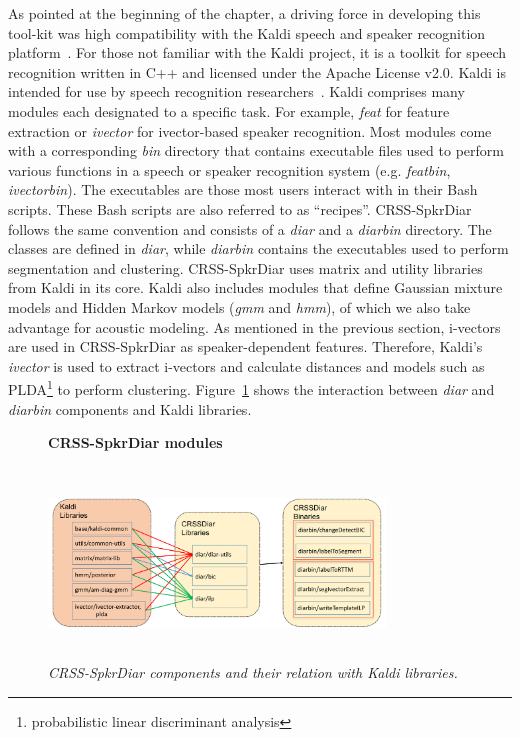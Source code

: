 As pointed at the beginning of the chapter, a driving force in developing this tool-kit was high compatibility with the Kaldi speech and speaker recognition platform~\cite{kaldi}. 
For those not familiar with the Kaldi project, it is a toolkit for speech recognition written in C++ and licensed under the Apache License v2.0. Kaldi is intended for use by speech recognition researchers~\cite{kaldi}. 
Kaldi comprises many modules each designated to a specific task. For example, {\it feat} for feature extraction or {\it ivector} for ivector-based speaker recognition. 
Most modules come with a corresponding {\it bin} directory  that contains executable files used to perform various functions in a speech or speaker recognition system (e.g. {\it featbin}, {\it ivectorbin}). 
The executables are those most users interact with in their Bash scripts. These Bash scripts are also referred to as ``recipes''. 
CRSS-SpkrDiar follows the same convention and consists of a {\it diar} and a {\it diarbin} directory. 
The classes are defined in {\it diar}, while {\it diarbin} contains the executables used to perform segmentation and clustering. 
CRSS-SpkrDiar uses matrix and utility libraries from Kaldi in its core.  
Kaldi also includes modules that define Gaussian mixture models and Hidden Markov models ({\it gmm} and {\it hmm}), of which we also take advantage for acoustic modeling. 
As mentioned in the previous section, i-vectors are used in CRSS-SpkrDiar as speaker-dependent features. 
Therefore, Kaldi's {\it ivector} is used to extract i-vectors and calculate distances and models such as PLDA\footnote{probabilistic linear discriminant analysis} to perform clustering. 
Figure~\ref{fig:crssdiar_vs_kaldi} shows the interaction between {\it diar} and {\it diarbin} components and Kaldi libraries. 

\begin{figure}[t!]
	\centering
	\textbf{CRSS-SpkrDiar modules}\par\medskip
	\includegraphics[height = 2in, width=0.8\textwidth]{figures/crssdiar_and_kaldi}
	\caption{\it \small CRSS-SpkrDiar components and their relation with Kaldi libraries.  }
	\label{fig:crssdiar_vs_kaldi}
	\vspace{-3mm}
\end{figure}

